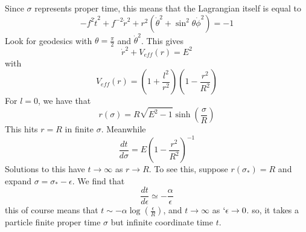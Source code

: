 Since $ \sigma  $ represents proper time, this means 
that the Lagrangian itself is equal to 
\[
 - f ^ 2 \dot{ t } ^ 2 + f ^{ - 2 } \dot{ r } ^ 2 + r ^ 2 
 ( \dot{ \theta } ^ 2 + \sin ^ 2 \theta  \dot{ \phi } ^ 2  ) = - 1  
\]
Look for geodesics with $ \theta = \frac{\pi }{ 2 } $ and $ \dot{ \theta } ^ 2  $. 
This gives 
\[
	\dot{ r } ^ 2 + V_{ eff} ( r)  = E ^ 2  
\] with 
\[
	V_{ eff }( r) = ( 1 + \frac{l ^ 2 }{ r ^ 2 } ) ( 1 - \frac{ r ^  2 }{R ^ 2  } ) 
\] For $ l  = 0 $, we have that 
\[
	r ( \sigma)  = R \sqrt{ E ^ 2 - 1}  \sinh ( \frac{ \sigma }{ R } ) 
\]  This hits $ r = R $ in finite $ \sigma $. Meanwhile 
\[
	\frac{ d t }{ d \sigma } = E \left(  1 - \frac{ r ^ 2 }{ R ^ 2 }  \right)  ^{ - 1}
\] Solutions to this have $ t \to \infty $ as $ r \to R $. 
To see this, suppose $ r ( \sigma _ * )  = R $ and expand $ \sigma = \sigma_{ * }  - \epsilon $. 
We find that 
\[
 \frac{ d t }{ d \epsilon } \simeq  - \frac{ \alpha }{ \epsilon } 
\] this of course means that $ t \sim  - \alpha \log ( \frac{ \epsilon }{ R } ) $, 
and $ t \to \infty $ as $ `\epsilon \to 0 $. 
so, it takes a particle finite proper time  $ \sigma $ but infinite 
coordinate time $ t $.

